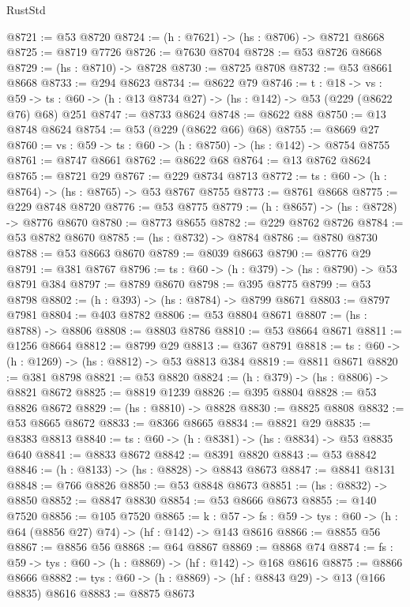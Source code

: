 \begin{lexlean}{RustStd}
\begin{coremodule}
@8721 := @53 @8720
@8724 := (h : @7621) -> (hs : @8706) -> @8721 @8668
@8725 := @8719 @7726
@8726 := @7630 @8704
@8728 := @53 @8726 @8668
@8729 := (hs : @8710) -> @8728
@8730 := @8725 @8708
@8732 := @53 @8661 @8668
@8733 := @294 @8623
@8734 := @8622 @79
@8746 := {t : @18} ->
  {vs : @59} -> {ts : @60} -> (h : @13 @8734 @27) -> (hs : @142) -> @53 (@229 (@8622 @76) @68) @251
@8747 := @8733 @8624
@8748 := @8622 @88
@8750 := @13 @8748 @8624
@8754 := @53 (@229 (@8622 @66) @68)
@8755 := @8669 @27
@8760 := {vs : @59} -> {ts : @60} -> (h : @8750) -> (hs : @142) -> @8754 @8755
@8761 := @8747 @8661
@8762 := @8622 @68
@8764 := @13 @8762 @8624
@8765 := @8721 @29
@8767 := @229 @8734 @8713
@8772 := {ts : @60} -> (h : @8764) -> (hs : @8765) -> @53 @8767 @8755
@8773 := @8761 @8668
@8775 := @229 @8748 @8720
@8776 := @53 @8775
@8779 := (h : @8657) -> (hs : @8728) -> @8776 @8670
@8780 := @8773 @8655
@8782 := @229 @8762 @8726
@8784 := @53 @8782 @8670
@8785 := (hs : @8732) -> @8784
@8786 := @8780 @8730
@8788 := @53 @8663 @8670
@8789 := @8039 @8663
@8790 := @8776 @29
@8791 := @381 @8767
@8796 := {ts : @60} -> (h : @379) -> (hs : @8790) -> @53 @8791 @384
@8797 := @8789 @8670
@8798 := @395 @8775
@8799 := @53 @8798
@8802 := (h : @393) -> (hs : @8784) -> @8799 @8671
@8803 := @8797 @7981
@8804 := @403 @8782
@8806 := @53 @8804 @8671
@8807 := (hs : @8788) -> @8806
@8808 := @8803 @8786
@8810 := @53 @8664 @8671
@8811 := @1256 @8664
@8812 := @8799 @29
@8813 := @367 @8791
@8818 := {ts : @60} -> (h : @1269) -> (hs : @8812) -> @53 @8813 @384
@8819 := @8811 @8671
@8820 := @381 @8798
@8821 := @53 @8820
@8824 := (h : @379) -> (hs : @8806) -> @8821 @8672
@8825 := @8819 @1239
@8826 := @395 @8804
@8828 := @53 @8826 @8672
@8829 := (hs : @8810) -> @8828
@8830 := @8825 @8808
@8832 := @53 @8665 @8672
@8833 := @8366 @8665
@8834 := @8821 @29
@8835 := @8383 @8813
@8840 := {ts : @60} -> (h : @8381) -> (hs : @8834) -> @53 @8835 @640
@8841 := @8833 @8672
@8842 := @8391 @8820
@8843 := @53 @8842
@8846 := (h : @8133) -> (hs : @8828) -> @8843 @8673
@8847 := @8841 @8131
@8848 := @766 @8826
@8850 := @53 @8848 @8673
@8851 := (hs : @8832) -> @8850
@8852 := @8847 @8830
@8854 := @53 @8666 @8673
@8855 := @140 @7520
@8856 := @105 @7520
@8865 := {k : @57} ->
  {fs : @59} -> {tys : @60} -> (h : @64 (@8856 @27) @74) -> (hf : @142) -> @143 @8616
@8866 := @8855 @56
@8867 := @8856 @56
@8868 := @64 @8867
@8869 := @8868 @74
@8874 := {fs : @59} -> {tys : @60} -> (h : @8869) -> (hf : @142) -> @168 @8616
@8875 := @8866 @8666
@8882 := {tys : @60} -> (h : @8869) -> (hf : @8843 @29) -> @13 (@166 @8835) @8616
@8883 := @8875 @8673

\end{coremodule}
\end{lexlean}
